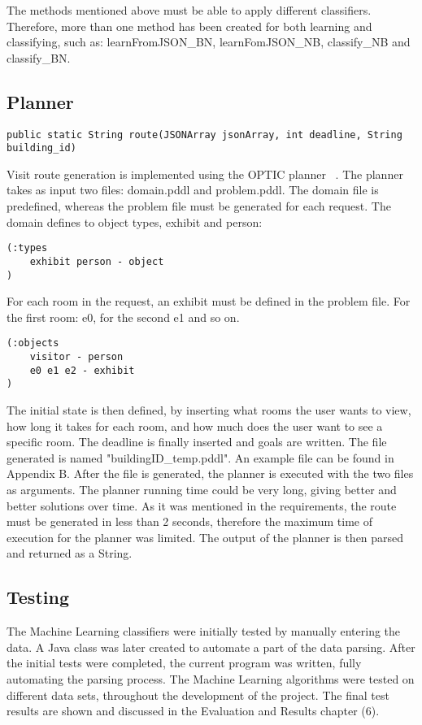 The methods mentioned above must be able to apply different classifiers. Therefore, more than one method has been created for both learning and classifying, such as: learnFromJSON\_BN, learnFomJSON\_NB, classify\_NB and classify\_BN. 
\newpage

\subsection{Planner}
\begin{lstlisting}
public static String route(JSONArray jsonArray, int deadline, String building_id)
\end{lstlisting}
Visit route generation is implemented using the OPTIC planner ~\cite{OPTIC}. The planner takes as input two files: domain.pddl and problem.pddl. The domain file is predefined, whereas the problem file must be generated for each request. 
The domain defines to object types, exhibit and person: 
\begin{lstlisting}
(:types
    exhibit person - object
)
\end{lstlisting}
For each room in the request, an exhibit must be defined in the problem file. For the first room: e0, for the second e1 and so on.
\begin{lstlisting}
(:objects
    visitor - person
    e0 e1 e2 - exhibit
)
\end{lstlisting}
The initial state is then defined, by inserting what rooms the user wants to view, how long it takes for each room, and how much does the user want to see a specific room. The deadline is finally inserted and goals are written. The file generated is named "buildingID\_temp.pddl". An example file can be found in Appendix B.
After the file is generated, the planner is executed with the two files as arguments. The planner running time could be very long, giving better and better solutions over time. As it was mentioned in the requirements, the route must be generated in less than 2 seconds, therefore the maximum time of execution for the planner was limited. The output of the planner is then parsed and returned as a String. 

\subsection{Testing}

The Machine Learning classifiers were initially tested by manually entering the data. A Java class was later created to automate a part of the data parsing. After the initial tests were completed, the current program was written, fully automating the parsing process. The Machine Learning algorithms were tested on different data sets, throughout the development of the project. The final test results are shown and discussed in the Evaluation and Results chapter (6). 

